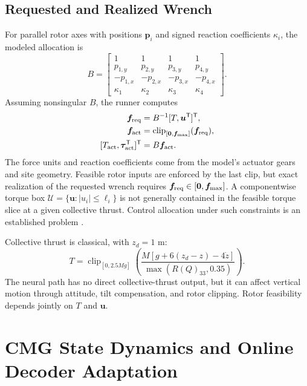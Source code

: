 \documentclass[letterpaper,10pt,conference]{IEEEtran}
\newcommand{\T}{^{\mathsf T}}
\newcommand{\clip}{\operatorname{clip}}
\begin{document}
\subsection{Requested and Realized Wrench}
For parallel rotor axes with positions $\bm p_i$ and signed reaction
coefficients $\kappa_i$, the modeled allocation is
\begin{equation}
 B=\begin{bmatrix}
 1&1&1&1\\p_{1,y}&p_{2,y}&p_{3,y}&p_{4,y}\\
 -p_{1,x}&-p_{2,x}&-p_{3,x}&-p_{4,x}\\
 \kappa_1&\kappa_2&\kappa_3&\kappa_4
 \end{bmatrix}.
\end{equation}
Assuming nonsingular $B$, the runner computes
\begin{equation}
 \begin{aligned}
 \bm f_{\rm req}&=B^{-1}[T,\bm u\T]\T,\\
 \bm f_{\rm act}&=\clip_{[\bm0,\bm f_{\max}]}(\bm f_{\rm req}),\\
 [T_{\rm act},\bm\tau_{\rm act}\T]\T&=B\bm f_{\rm act}.
 \end{aligned}
 \label{eq:mixer}
\end{equation}
The force units and reaction coefficients come from the model's actuator
gears and site geometry. Feasible rotor inputs are enforced by the last
clip, but exact realization of the requested wrench requires
$\bm f_{\rm req}\in[\bm0,\bm f_{\max}]$. A componentwise torque box
$\mathcal U=\{\bm u:|u_i|\le\ell_i\}$ is not generally contained in the
feasible torque slice at a given collective thrust. Control allocation under such constraints
is an established problem \cite{monteiro2016allocation}.

Collective thrust is classical, with $z_d=1$ m:
\begin{equation}
 T=\clip_{[0,2.5Mg]}
 \left(\frac{M[g+6(z_d-z)-4\dot z]}{\max(R(Q)_{33},0.35)}\right).
 \label{eq:collective}
\end{equation}
The neural path has no direct collective-thrust output, but it can affect
vertical motion through attitude, tilt compensation, and rotor clipping.
Rotor feasibility depends jointly on $T$ and $\bm u$.

\section{CMG State Dynamics and Online Decoder Adaptation}
\label{sec:architecture}
\end{document}
